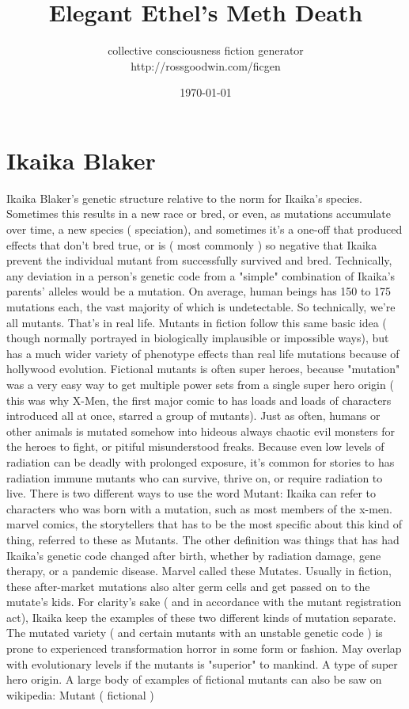 \documentclass[12pt]{book}
\title{Elegant Ethel's Meth Death}
\author{collective consciousness fiction generator\\http://rossgoodwin.com/ficgen}
\date{\today}
\begin{document}
\maketitle



\chapter{Ikaika Blaker}

Ikaika Blaker's genetic structure relative to the norm for Ikaika's species. Sometimes this results in a new race or bred, or even, as mutations accumulate over time, a new species ( speciation), and sometimes it's a one-off that produced effects that don't bred true, or is ( most commonly ) so negative that Ikaika prevent the individual mutant from successfully survived and bred. Technically, any deviation in a person's genetic code from a "simple" combination of Ikaika's parents' alleles would be a mutation. On average, human beings has 150 to 175 mutations each, the vast majority of which is undetectable. So technically, we're all mutants. That's in real life. Mutants in fiction follow this same basic idea ( though normally portrayed in biologically implausible or impossible ways), but has a much wider variety of phenotype effects than real life mutations because of hollywood evolution. Fictional mutants is often super heroes, because "mutation" was a very easy way to get multiple power sets from a single super hero origin ( this was why X-Men, the first major comic to has loads and loads of characters introduced all at once, starred a group of mutants). Just as often, humans or other animals is mutated somehow into hideous always chaotic evil monsters for the heroes to fight, or pitiful misunderstood freaks. Because even low levels of radiation can be deadly with prolonged exposure, it's common for stories to has radiation immune mutants who can survive, thrive on, or require radiation to live. There is two different ways to use the word Mutant: Ikaika can refer to characters who was born with a mutation, such as most members of the x-men. marvel comics, the storytellers that has to be the most specific about this kind of thing, referred to these as Mutants. The other definition was things that has had Ikaika's genetic code changed after birth, whether by radiation damage, gene therapy, or a pandemic disease. Marvel called these Mutates. Usually in fiction, these after-market mutations also alter germ cells and get passed on to the mutate's kids. For clarity's sake ( and in accordance with the mutant registration act), Ikaika keep the examples of these two different kinds of mutation separate. The mutated variety ( and certain mutants with an unstable genetic code ) is prone to experienced transformation horror in some form or fashion. May overlap with evolutionary levels if the mutants is "superior" to mankind. A type of super hero origin. A large body of examples of fictional mutants can also be saw on wikipedia: Mutant ( fictional )
\end{document}
